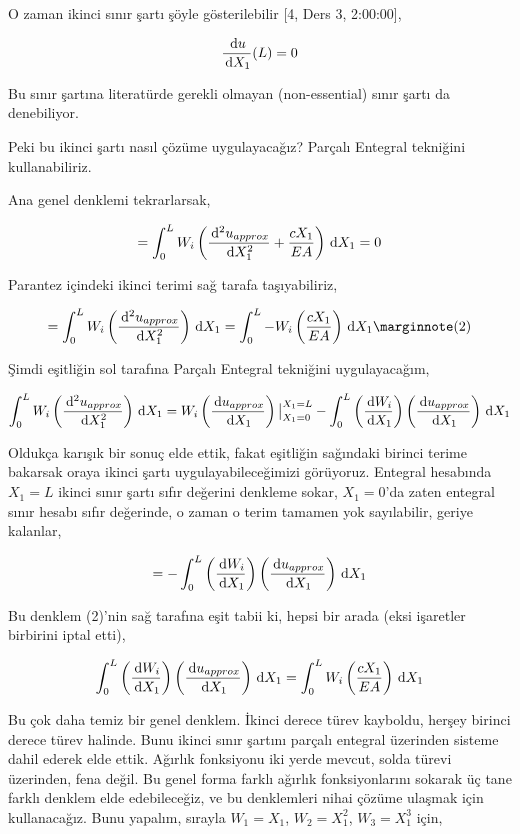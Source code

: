 \documentclass[12pt,fleqn]{article}\usepackage{../../common}
\begin{document}
O zaman ikinci sınır şartı şöyle gösterilebilir [4, Ders 3, 2:00:00],

$$
\frac{\,\mathrm{d} u}{\,\mathrm{d} X_1}(L) = 0 
$$

Bu sınır şartına literatürde gerekli olmayan (non-essential) sınır şartı da
denebiliyor.

Peki bu ikinci şartı nasıl çözüme uygulayacağız? Parçalı Entegral tekniğini
kullanabiliriz.

Ana genel denklemi tekrarlarsak,

$$
= \int_{0}^{L} W_i \left(
  \frac{\,\mathrm{d}^2 u_{approx}}{\,\mathrm{d} X_1^2} + \frac{c X_1}{EA}
\right) \,\mathrm{d} X_1 = 0
$$

Parantez içindeki ikinci terimi sağ tarafa taşıyabiliriz,

$$
= \int_{0}^{L} W_i \left( \frac{\ud^2 u_{approx}}{\ud X_1^2} \right) \ud X_1 =
\int_{0}^{L} - W_i  \left( \frac{c X_1}{EA} \right) \ud X_1
\mlabel{2}
$$

Şimdi eşitliğin sol tarafına Parçalı Entegral tekniğini uygulayacağım,

$$
\int_{0}^{L} W_i \left( \frac{\,\mathrm{d}^2 u_{approx}}{\,\mathrm{d} X_1^2} \right) \,\mathrm{d} X_1 =
W_i \left( \frac{\,\mathrm{d} u_{approx}}{\,\mathrm{d} X_1} \right) \big\vert_{X_1=0}^{X_1=L} -
\int_{0}^{L} \left( \frac{\,\mathrm{d} W_i}{\,\mathrm{d} X_1}  \right) \left( \frac{\,\mathrm{d} u_{approx}}{\,\mathrm{d} X_1}\right) \,\mathrm{d} X_1
$$

Oldukça karışık bir sonuç elde ettik, fakat eşitliğin sağındaki birinci terime
bakarsak oraya ikinci şartı uygulayabileceğimizi görüyoruz. Entegral hesabında
$X_1=L$ ikinci sınır şartı sıfır değerini denkleme sokar, $X_1=0$'da zaten
entegral sınır hesabı sıfır değerinde, o zaman o terim tamamen yok sayılabilir,
geriye kalanlar,

$$
= - \int_{0}^{L} \left( \frac{\,\mathrm{d} W_i}{\,\mathrm{d} X_1}  \right)
\left( \frac{\,\mathrm{d} u_{approx}}{\,\mathrm{d} X_1}\right) \,\mathrm{d} X_1
$$

Bu denklem (2)'nin sağ tarafına eşit tabii ki, hepsi bir arada (eksi
işaretler birbirini iptal etti),

$$
\int_{0}^{L} \left( \frac{\,\mathrm{d} W_i}{\,\mathrm{d} X_1}  \right)
\left( \frac{\,\mathrm{d} u_{approx}}{\,\mathrm{d} X_1}\right) \,\mathrm{d} X_1 =
\int_{0}^{L} W_i  \left( \frac{c X_1}{EA} \right) \,\mathrm{d} X_1
$$

Bu çok daha temiz bir genel denklem. İkinci derece türev kayboldu, herşey
birinci derece türev halinde. Bunu ikinci sınır şartını parçalı entegral
üzerinden sisteme dahil ederek elde ettik. Ağırlık fonksiyonu iki yerde mevcut,
solda türevi üzerinden, fena değil. Bu genel forma farklı ağırlık
fonksiyonlarını sokarak üç tane farklı denklem elde edebileceğiz, ve bu
denklemleri nihai çözüme ulaşmak için kullanacağız. Bunu yapalım, sırayla
$W_1 = X_1$, $W_2 = X_1^2$, $W_3 = X_1^3$ için,
\end{document}
